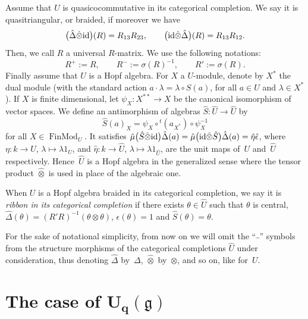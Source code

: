 \documentclass[pdftex]{sigma}%
\numberwithin{equation}{section}
\numberwithin{figure}{section}
\begin{document}
Assume that $U$ is quasicocommutative in its categorical completion. We say it is quasitriangular, or braided, if moreover we have
\begin{equation}\label{Rdef0}
\big(\hat{\Delta} \hat{\otimes} {\rm id}\big)(R)=R_{13}R_{23} ,\qquad \big({\rm id}\hat{\otimes} \hat{\Delta}\big)(R)=R_{13}R_{12}.
\end{equation}
Then, we call $R$ a universal $R$-matrix. We use the following notations:
\begin{equation*}%
R^+:=R, \qquad R^-:= \sigma(R)^{-1},\qquad R':=\sigma(R).
\end{equation*}
Finally assume that $U$ is a Hopf algebra. For $X$ a $U$-module, denote by $X^*$ the dual module (with the standard action $a\cdot \lambda = \lambda \circ S(a)$, for all $a\in U$ and $\lambda\in X^*$). If $X$ is finite dimensional, let $\psi_X\colon X^{**}\to X$ be the canonical isomorphism of vector spaces. We define an antimorphism of algebras $\hat{S}\colon \hat{U}\to \hat{U}$ by
\[
\hat{S}(a)_{X}=\psi_X \circ {}^t(a_{X^*})\circ \psi_X^{-1}
\]
for all $X\in \operatorname{FinMod}_U$. It satisfies $\hat{\mu}\big(\hat{S}\hat{\otimes} {\rm id} \big)\hat{\Delta}(a)=\hat{\mu}\big({\rm id}\hat{\otimes}\hat{S} \big)\hat{\Delta}(a)=\hat{\eta}\hat{\epsilon}$, where $\eta\colon k\to U$, $\lambda\mapsto \lambda 1_U$, and $\hat{\eta}\colon k\to \hat{U}$, $\lambda\mapsto \lambda 1_{\hat{U}}$, are the unit maps of~$U$ and~$\hat U$ respectively. Hence~$\hat{U}$ is a Hopf algebra in the generalized sense where the tensor product $\hat{\otimes}$ is used in place of the algebraic one.

When $U$ is a Hopf algebra braided in its categorical completion, we say it is {\it ribbon in its categorical completion} if there exists $\theta\in \hat{U}$ such that $\theta$ is central,
$\hat{\Delta}(\theta)=(R'R)^{-1}(\theta\otimes \theta)$, $\epsilon(\theta)=1$ and $\hat{S}(\theta)=\theta$.

For the sake of notational simplicity, from now on we will omit the ``$\hat{\ \ }$'' symbols from the structure morphisms of the categorical completions $\hat U$ under consideration, thus denoting $\hat \Delta$ by~$\Delta$, $\hat \otimes$ by~$\otimes$, and so on, like for~$U$.

\section[The case of U\_q(g)]{The case of $\boldsymbol{U_q({\mathfrak g})}$}\label{Uq}
\end{document}
